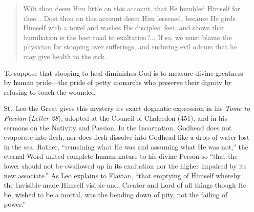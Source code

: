 \begin{quote}
Wilt thou deem Him little on this account, that He humbled Himself for thee... Dost thou on this account deem Him lessened, because He girds Himself with a towel and washes His disciples' feet, and shows that humiliation is the best road to exaltation?... If so, we must blame the physician for stooping over sufferings, and enduring evil odours that he may give health to the sick.
\end{quote}

To suppose that stooping to heal diminishes God is to measure divine greatness by human pride---the pride of petty monarchs who preserve their dignity by refusing to touch the wounded.

St.\ Leo the Great gives this mystery its exact dogmatic expression in his \textit{Tome to Flavian} (\textit{Letter 28}), adopted at the Council of Chalcedon (451), and in his sermons on the Nativity and Passion. In the Incarnation, Godhead does not evaporate into flesh, nor does flesh dissolve into Godhead like a drop of water lost in the sea. Rather, ``remaining what He was and assuming what He was not,'' the eternal Word united complete human nature to his divine Person so ``that the lower should not be swallowed up in its exaltation nor the higher impaired by its new associate.'' As Leo explains to Flavian, ``that emptying of Himself whereby the Invisible made Himself visible and, Creator and Lord of all things though He be, wished to be a mortal, was the bending down of pity, not the failing of power.''

